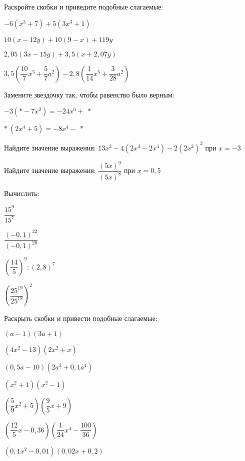 \begin{class}[type=homework, number=1]
	\begin{listofex}
		\item Раскройте скобки и приведите подобные слагаемые:
		\begin{enumcols}[itemcolumns=2]
			\item \( -6(x^3+7)+5(3x^3+1) \)
			\item \( 10(x-12y)+10(9-x)+119y \)
			\item \( 2,05(3x-15y)+3,5(x+2,07y) \)
			\item \( 3,5\left( \dfrac{10}{7}x^5+\dfrac{5}{7}a^2 \right)-2,8\left( \dfrac{1}{14}x^5+\dfrac{3}{28}a^2 \right) \)
		\end{enumcols}
		\item Замените звездочку так, чтобы равенство было верным:
		\begin{enumcols}[itemcolumns=2]
			\item \( -3(*-7x^2)=-24x^6+\:* \)
			\item \( *\:(2x^4+5)=-8x^4-\:* \)
		\end{enumcols}
		\item Найдите значение выражения: \( 13x^3-4(2x^3-2x^4)-2(2x^2)^2 \) при \( x=-3 \)
		\item Найдите значение выражения: \( \dfrac{(5x)^9}{(5x)^8} \) при \( x=0,5 \)
		\item Вычислить:
		\begin{enumcols}[itemcolumns=4]
			\item \( \dfrac{15^9}{15^7} \)
			\item \( \dfrac{(-0,1)^{22}}{(-0,1)^{20}} \)
			\item \( \left( \dfrac{14}{5} \right)^{9}:\left( 2,8 \right)^{7} \)
			\item \( \left( \dfrac{25^{19}}{25^{18}} \right)^2 \)
		\end{enumcols}
		\item Раскрыть скобки и привести подобные слагаемые:
		\begin{enumcols}[itemcolumns=3]
			\item \( (a-1)(3a+1) \)
			\item \( (4x^2-13)(2x^2+x) \)
			\item \( (0,5a-10)(2a^2+0,1a^4) \)
			\item \( (x^2+1)(x^2-1) \)
			\item \( \left( \dfrac{5}{9}x^2+5 \right)\left( \dfrac{9}{5}x+9 \right) \)
			\item \( \left( \dfrac{12}{5}x-0,36 \right)\left( \dfrac{1}{24}x^4-\dfrac{100}{36} \right) \)
			\item \( (0,1x^2-0,01)(0,02x+0,2) \)
		\end{enumcols}
	\end{listofex}
\end{class}
